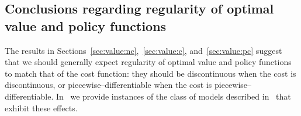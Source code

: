 \documentclass{article}
\begin{document}

\subsection{Conclusions regarding regularity of optimal value and policy functions}
The results in Sections~\ref{sec:value:nc},~\ref{sec:value:c}, and~\ref{sec:value:pc} suggest that we should generally expect regularity of optimal value and policy functions to match that of the cost function:  they should be discontinuous when the cost is discontinuous, or piecewise--differentiable when the cost is piecewise--differentiable.
In~ we provide instances of the class of models described in~ that exhibit these effects. 
\end{document}
